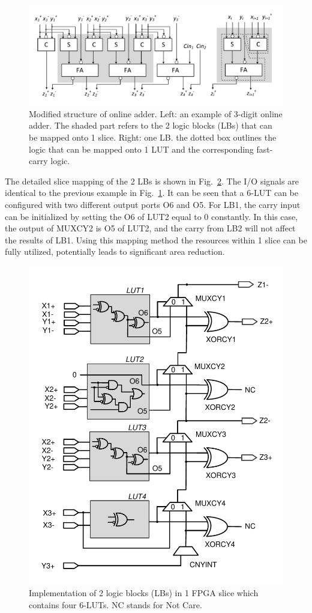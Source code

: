 \documentclass[conference]{IEEEtran}
\begin{document}
\begin{figure}[htbp]
	\centering
	\includegraphics[width=.5\textwidth]{./Figures/SDadder_FPGA_New.pdf}
	\caption{Modified structure of online adder. Left: an example of 3-digit online adder. The shaded part refers to the 2 logic blocks (LBs) that can be mapped onto 1 slice. Right: one LB. the dotted box outlines the logic that can be mapped onto 1 LUT and the corresponding fast-carry logic.}
	\label{Fig:ModifiedOA}
\end{figure}

The detailed slice mapping of the 2 LBs is shown in Fig.~\ref{Fig:SliceNew}. The I/O signals are identical to the previous example in Fig.~\ref{Fig:ModifiedOA}. It can be seen that a 6-LUT can be configured with two different output ports O6 and O5. For LB1, the carry input can be initialized by setting the O6 of LUT2 equal to 0 constantly. In this case, the output of MUXCY2 is O5 of LUT2, and the carry from LB2 will not affect the results of LB1. Using this mapping method the resources within 1 slice can be fully utilized, potentially leads to significant area reduction.  

\begin{figure}[htbp]
	\centering
	\includegraphics[width=.48\textwidth]{./Figures/SDadder_FastCarry_New.pdf}
	\caption{Implementation of 2 logic blocks (LBs) in 1 FPGA slice which contains four 6-LUTs. NC stands for Not Care.}
	\label{Fig:SliceNew}
\end{figure}
\end{document}
